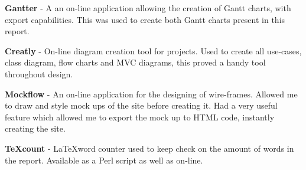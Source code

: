 \textbf{Gantter} - A an on-line application allowing the creation of Gantt charts, with export capabilities. This was used to create both Gantt charts present in this report.

\textbf{Creatly} - On-line diagram creation tool for projects. Used to create all use-cases, class diagram, flow charts and MVC diagrams, this proved a handy tool throughout design.

\textbf{Mockflow} - An on-line application for the designing of wire-frames. Allowed me to draw and style mock ups of the site before creating it. Had a very useful feature which allowed me to export the mock up to HTML code, instantly creating the site.

\textbf{TeXcount} - \LaTeX word counter used to keep check on the amount of words in the report. Available as a Perl script as well as on-line.
